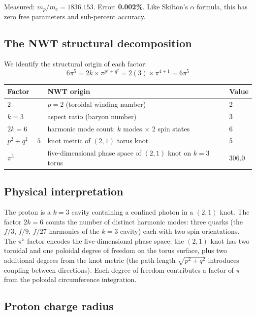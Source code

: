 \documentclass[11pt,a4paper]{article}
\begin{document}
Measured: $m_p/m_e = 1836.153$. Error: \textbf{0.002\%}. Like Skilton's $\alpha$ formula, this has zero free parameters and sub-percent accuracy.

\subsection{The NWT structural decomposition}

We identify the structural origin of each factor:
\begin{equation}
  6\pi^5 = 2k \times \pi^{p^2 + q^2} = 2(3) \times \pi^{4+1} = 6\pi^5
  \label{eq:lenz-decomp}
\end{equation}

\begin{table}[h]
\centering
\begin{tabular}{@{}lll@{}}
\toprule
Factor & NWT origin & Value \\
\midrule
2 & $p = 2$ (toroidal winding number) & 2 \\
$k = 3$ & aspect ratio (baryon number) & 3 \\
$2k = 6$ & harmonic mode count: $k$ modes $\times$ 2 spin states & 6 \\
$p^2 + q^2 = 5$ & knot metric of $(2,1)$ torus knot & 5 \\
$\pi^5$ & five-dimensional phase space of $(2,1)$ knot on $k\!=\!3$ torus & 306.0 \\
\bottomrule
\end{tabular}
\end{table}

\subsection{Physical interpretation}

The proton is a $k=3$ cavity containing a confined photon in a $(2,1)$ knot. The factor $2k = 6$ counts the number of distinct harmonic modes: three quarks (the $f/3$, $f/9$, $f/27$ harmonics of the $k=3$ cavity) each with two spin orientations. The $\pi^5$ factor encodes the five-dimensional phase space: the $(2,1)$ knot has two toroidal and one poloidal degree of freedom on the torus surface, plus two additional degrees from the knot metric (the path length $\sqrt{p^2 + q^2}$ introduces coupling between directions). Each degree of freedom contributes a factor of $\pi$ from the poloidal circumference integration.

\subsection{Proton charge radius}
\end{document}
